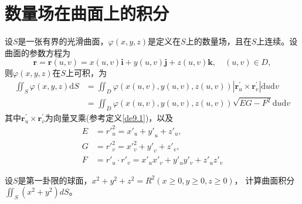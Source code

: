 \documentclass[lang=cn,10pt]{elegantbook}
\newcommand\bv[1]{\boldsymbol{#1}}
\begin{document}
\section{数量场在曲面上的积分}
\begin{theorem}
    设$S$是一张有界的光滑曲面，$\varphi(x,y,z)$是定义在$S$上的数量场，且在$S$上连续。设曲面的参数方程为
    \begin{equation}
        \bv{r}=\bv{r}(u,v)=x(u,v)\boldsymbol{i}+y(u,v)\boldsymbol{j}+z(u,v)\boldsymbol{k},\quad(u,v)\in D,
    \end{equation}
    则$\varphi(x,y,z)$在$S$上可积，为
    \begin{equation*}
        \begin{aligned}
            \iint_{S}\varphi(x,y,z)\mathrm{d}S
             & =\iint_D\varphi(x(u,v),y(u,v),z(u,v))|\boldsymbol{r}_u^{\prime}\times\boldsymbol{r}_v^{\prime}|\mathrm{d}u\mathrm{d}v \\
             & =\iint_{D}\varphi(x(u,v),y(u,v),z(u,v))\sqrt{EG-F^{2}}\mathrm{d}u\mathrm{d}v
        \end{aligned}
    \end{equation*}
    其中$\boldsymbol{r}_u^{\prime}\times\boldsymbol{r}_v^{\prime}$为向量叉乘(参考定义\ref{de9.1})，以及
    \begin{equation*}
        \begin{aligned}
            E & ={r'}_u^2={x'}_u+{y'}_u+{z'}_u,                \\
            G & ={r'}_v^2={x'}_v^2+{y'}_v+{z'}_v,              \\
            F & ={r'}_u\cdot {r'}_v=x'_ux'_v+y'_uy'_v+z'_uz'_v
        \end{aligned}
    \end{equation*}
\end{theorem}

\begin{example}
    设$S$是第一卦限的球面，$x^2+y^2+z^2=R^2\left(x\geqslant0,y\geqslant0,z\geqslant0\right)$，
    计算曲面积分$\iint_S(x^2+y^2)dS$。
\end{example}
\end{document}
